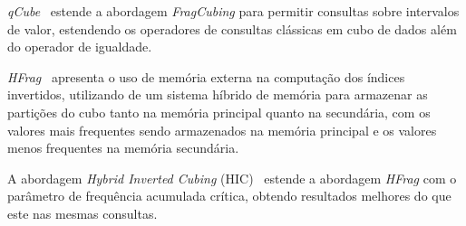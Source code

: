 \textit{qCube}~\cite{silvaQCubeEfficientIntegration2013} estende a abordagem \textit{FragCubing} para permitir consultas sobre intervalos de valor, estendendo os operadores de consultas clássicas em cubo de dados além do operador de igualdade.

\textit{HFrag}~\cite{silvaHybridMemoryData2015} apresenta o uso de memória externa na computação dos índices invertidos, utilizando de um sistema híbrido de memória para armazenar as partições do cubo tanto na memória principal quanto na secundária, com os valores mais frequentes sendo armazenados na memória principal e os valores menos frequentes na memória secundária.

A abordagem \textit{Hybrid Inverted Cubing} (HIC)~\cite{silvaComputingBIGData2016} estende a abordagem \textit{HFrag} com o parâmetro de frequência acumulada crítica, obtendo resultados melhores do que este nas mesmas consultas.


